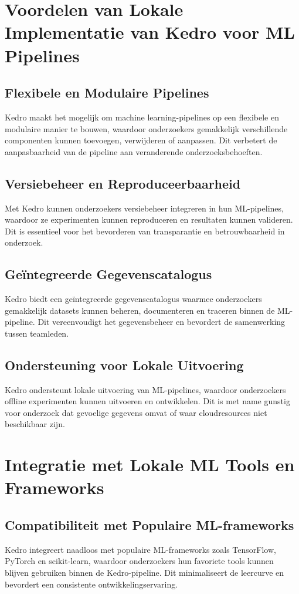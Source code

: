 \section{Voordelen van Lokale Implementatie van Kedro voor ML Pipelines}

\subsection{Flexibele en Modulaire Pipelines}
Kedro maakt het mogelijk om machine learning-pipelines op een flexibele en modulaire manier te bouwen, waardoor onderzoekers gemakkelijk verschillende componenten kunnen toevoegen, verwijderen of aanpassen. Dit verbetert de aanpasbaarheid van de pipeline aan veranderende onderzoeksbehoeften.

\subsection{Versiebeheer en Reproduceerbaarheid}
Met Kedro kunnen onderzoekers versiebeheer integreren in hun ML-pipelines, waardoor ze experimenten kunnen reproduceren en resultaten kunnen valideren. Dit is essentieel voor het bevorderen van transparantie en betrouwbaarheid in onderzoek.

\subsection{Geïntegreerde Gegevenscatalogus}
Kedro biedt een geïntegreerde gegevenscatalogus waarmee onderzoekers gemakkelijk datasets kunnen beheren, documenteren en traceren binnen de ML-pipeline. Dit vereenvoudigt het gegevensbeheer en bevordert de samenwerking tussen teamleden.

\subsection{Ondersteuning voor Lokale Uitvoering}
Kedro ondersteunt lokale uitvoering van ML-pipelines, waardoor onderzoekers offline experimenten kunnen uitvoeren en ontwikkelen. Dit is met name gunstig voor onderzoek dat gevoelige gegevens omvat of waar cloudresources niet beschikbaar zijn.

\section{Integratie met Lokale ML Tools en Frameworks}

\subsection{Compatibiliteit met Populaire ML-frameworks}
Kedro integreert naadloos met populaire ML-frameworks zoals TensorFlow, PyTorch en scikit-learn, waardoor onderzoekers hun favoriete tools kunnen blijven gebruiken binnen de Kedro-pipeline. Dit minimaliseert de leercurve en bevordert een consistente ontwikkelingservaring.

